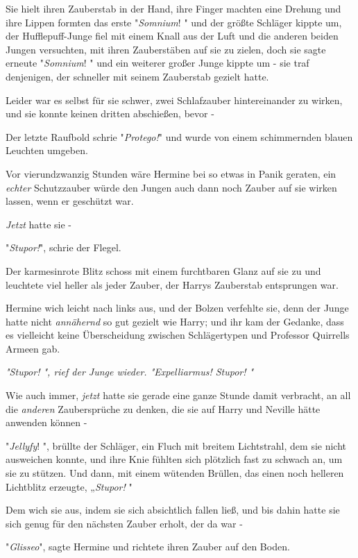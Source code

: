 {Sie hielt ihren Zauberstab in der Hand, ihre Finger machten eine Drehung und ihre Lippen formten das erste "\emph{Somnium}! " und der größte Schläger kippte um, der Hufflepuff-Junge fiel mit einem Knall aus der Luft und die anderen beiden Jungen versuchten, mit ihren Zauberstäben auf sie zu zielen, doch sie sagte erneute "\emph{Somnium}! " und ein weiterer großer Junge kippte um - sie traf denjenigen, der schneller mit seinem Zauberstab gezielt hatte.

Leider war es selbst für sie schwer, zwei Schlafzauber hintereinander zu wirken, und sie konnte keinen dritten abschießen, bevor -

Der letzte Raufbold schrie "\emph{Protego!}" und wurde von einem schimmernden blauen Leuchten umgeben.

Vor vierundzwanzig Stunden wäre Hermine bei so etwas in Panik geraten, ein \emph{echter} Schutzzauber würde den Jungen auch dann noch Zauber auf sie wirken lassen, wenn er geschützt war.

\emph{Jetzt} hatte sie -

"\emph{Stupor!}", schrie der Flegel.

Der karmesinrote Blitz schoss mit einem furchtbaren Glanz auf sie zu und leuchtete viel heller als jeder Zauber, der Harrys Zauberstab entsprungen war.

Hermine wich leicht nach links aus, und der Bolzen verfehlte sie, denn der Junge hatte nicht \emph{annähernd} so gut gezielt wie Harry; und ihr kam der Gedanke, dass es vielleicht keine Überscheidung zwischen Schlägertypen und Professor Quirrells Armeen gab.

\emph{\emph{"Stupor! "}, rief der Junge wieder. \emph{"Expelliarmus! Stupor! "}}

Wie auch immer, \emph{jetzt} hatte sie gerade eine ganze Stunde damit verbracht, an all die \emph{anderen} Zaubersprüche zu denken, die sie auf Harry und Neville hätte anwenden können -

"\emph{Jellyfy}! ", brüllte der Schläger, ein Fluch mit breitem Lichtstrahl, dem sie nicht ausweichen konnte, und ihre Knie fühlten sich plötzlich fast zu schwach an, um sie zu stützen. Und dann, mit einem wütenden Brüllen, das einen noch helleren Lichtblitz erzeugte, „\emph{Stupor!} "

Dem wich sie aus, indem sie sich absichtlich fallen ließ, und bis dahin hatte sie sich genug für den nächsten Zauber erholt, der da war -

"\emph{Glisseo}", sagte Hermine und richtete ihren Zauber auf den Boden.

}
